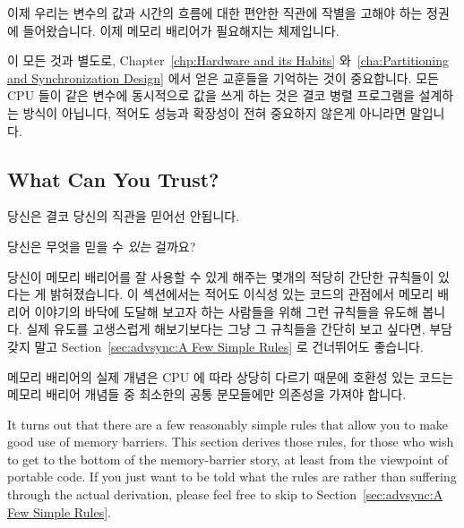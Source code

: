 이제 우리는 변수의 값과 시간의 흐름에 대한 편안한 직관에 작별을 고해야 하는
정권에 들어왔습니다.
이제 메모리 배리어가 필요해지는 체제입니다.

이 모든 것과 별도로, Chapter~\ref{chp:Hardware and its Habits}
와~\ref{cha:Partitioning and Synchronization Design} 에서 얻은 교훈들을
기억하는 것이 중요합니다.
모든 CPU 들이 같은 변수에 동시적으로 값을 쓰게 하는 것은 결코 병렬 프로그램을
설계하는 방식이 아닙니다, 적어도 성능과 확장성이 전혀 중요하지 않은게 아니라면
말입니다.

\subsection{What Can You Trust?}
\label{sec:advsync:What Can You Trust?}

당신은 결코 당신의 직관을 믿어선 안됩니다.

당신은 무엇을 믿을 수 \emph{있는} 걸까요?

당신이 메모리 배리어를 잘 사용할 수 있게 해주는 몇개의 적당히 간단한 규칙들이
있다는 게 밝혀졌습니다.
이 섹션에서는 적어도 이식성 있는 코드의 관점에서 메모리 배리어 이야기의 바닥에
도달해 보고자 하는 사람들을 위해 그런 규칙들을 유도해 봅니다.
실제 유도를 고생스럽게 해보기보다는 그냥 그 규칙들을 간단히 보고 싶다면, 부담
갖지 말고 Section~\ref{sec:advsync:A Few Simple Rules} 로 건너뛰어도 좋습니다.

메모리 배리어의 실제 개념은 CPU 에 따라 상당히 다르기 때문에 호환성 있는 코드는
메모리 배리어 개념들 중 최소한의 공통 분모들에만 의존성을 가져야 합니다.
\iffalse

It turns out that there are a few reasonably simple rules that
allow you to make good use of memory barriers.
This section derives those rules, for those who wish to get
to the bottom of the memory-barrier story, at least from the viewpoint
of portable code.
If you just want to be told what the rules are rather than suffering
through the actual derivation,
please feel free to skip to Section~\ref{sec:advsync:A Few Simple Rules}.

